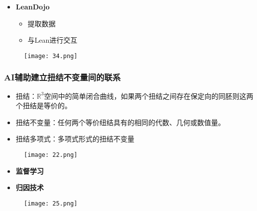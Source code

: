 \documentclass[CJK,aspectratio=169]{beamer}  %
\begin{document}
	\begin{frame}
		\begin{itemize}
			\item \textbf{LeanDojo}
			\begin{itemize}
				\item 提取数据
				\item 与Lean进行交互
			\end{itemize}
		\end{itemize}
		\begin{figure}
			\centering
			\texttt{[image: 34.png]}
		\end{figure}
	\end{frame}
	\begin{frame}
		\frametitle{AI辅助建立扭结不变量间的联系}
		\begin{itemize}
			\item 扭结：$\mathbb{R}^3$空间中的简单闭合曲线，如果两个扭结之间存在保定向的同胚则这两个扭结是等价的。
			\item 扭结不变量：任何两个等价纽结具有的相同的代数、几何或数值量。
			\item 扭结多项式：多项式形式的扭结不变量
		\end{itemize}
		\begin{figure}
			\centering
			\texttt{[image: 22.png]}
		\end{figure}
	\end{frame}
	\begin{frame}
		\begin{itemize}
			\item \textbf{监督学习}
			\item \textbf{归因技术}
		\end{itemize}
		\begin{figure}
			\centering
			\texttt{[image: 25.png]}
		\end{figure}
	\end{frame}
\end{document}
